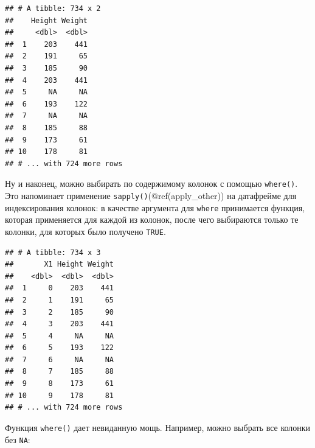 \documentclass[]{book}
\newenvironment{Shaded}{\begin{snugshade}}{\end{snugshade}}
\newcommand{\KeywordTok}[1]{\textcolor[rgb]{0.13,0.29,0.53}{\textbf{#1}}}
\newcommand{\StringTok}[1]{\textcolor[rgb]{0.31,0.60,0.02}{#1}}
\newcommand{\ControlFlowTok}[1]{\textcolor[rgb]{0.13,0.29,0.53}{\textbf{#1}}}
\newcommand{\OperatorTok}[1]{\textcolor[rgb]{0.81,0.36,0.00}{\textbf{#1}}}
\newcommand{\NormalTok}[1]{#1}
\begin{document}
\begin{Shaded}
\end{Shaded}

\begin{verbatim}
## # A tibble: 734 x 2
##    Height Weight
##     <dbl>  <dbl>
##  1    203    441
##  2    191     65
##  3    185     90
##  4    203    441
##  5     NA     NA
##  6    193    122
##  7     NA     NA
##  8    185     88
##  9    173     61
## 10    178     81
## # ... with 724 more rows
\end{verbatim}

Ну и наконец, можно выбирать по содержимому колонок с помощью
\texttt{where()}. Это напоминает применение
\texttt{sapply()}(@ref(apply\_other)) на датафрейме для индексирования
колонок: в качестве аргумента для \texttt{where} принимается функция,
которая применяется для каждой из колонок, после чего выбираются только
те колонки, для которых было получено \texttt{TRUE}.

\begin{Shaded}
\end{Shaded}

\begin{verbatim}
## # A tibble: 734 x 3
##       X1 Height Weight
##    <dbl>  <dbl>  <dbl>
##  1     0    203    441
##  2     1    191     65
##  3     2    185     90
##  4     3    203    441
##  5     4     NA     NA
##  6     5    193    122
##  7     6     NA     NA
##  8     7    185     88
##  9     8    173     61
## 10     9    178     81
## # ... with 724 more rows
\end{verbatim}

Функция \texttt{where()} дает невиданную мощь. Например, можно выбрать
все колонки без \texttt{NA}:

\begin{Shaded}
\end{Shaded}
\end{document}
